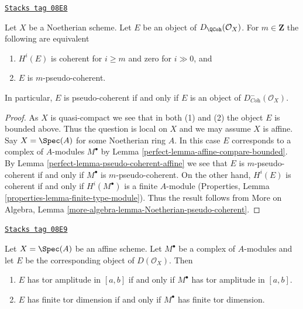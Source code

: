 \begin{lemma}
\label{perfect-lemma-identify-pseudo-coherent-noetherian}
\href{https://stacks.math.columbia.edu/tag/08E8}{\texttt{Stacks tag 08E8}}

Let $X$ be a Noetherian scheme. Let $E$ be an object of
$D_\QCoh(\mathcal{O}_X)$. For $m \in \mathbf{Z}$ the
following are equivalent
\begin{enumerate}
\item $H^i(E)$ is coherent for $i \geq m$ and zero for $i \gg 0$, and
\item $E$ is $m$-pseudo-coherent.
\end{enumerate}
In particular, $E$ is pseudo-coherent if and only if $E$ is an object
of $D^-_{\textit{Coh}}(\mathcal{O}_X)$.
\end{lemma}

\begin{proof}

As $X$ is quasi-compact we see that in both (1) and (2) the object $E$
is bounded above. Thus the question is local on $X$ and we may assume
$X$ is affine. Say $X = \Spec(A)$ for some Noetherian ring $A$.
In this case $E$ corresponds to a complex of $A$-modules $M^\bullet$
by Lemma \ref{perfect-lemma-affine-compare-bounded}. By
Lemma \ref{perfect-lemma-pseudo-coherent-affine}
we see that $E$ is $m$-pseudo-coherent if and only if $M^\bullet$
is $m$-pseudo-coherent. On the other hand, $H^i(E)$ is coherent
if and only if $H^i(M^\bullet)$ is a finite $A$-module
(Properties, Lemma \ref{properties-lemma-finite-type-module}).
Thus the result follows from More on Algebra, Lemma
\ref{more-algebra-lemma-Noetherian-pseudo-coherent}.
\end{proof}

\begin{lemma}
\label{perfect-lemma-tor-dimension-affine}
\href{https://stacks.math.columbia.edu/tag/08E9}{\texttt{Stacks tag 08E9}}

Let $X = \Spec(A)$ be an affine scheme. Let $M^\bullet$ be a
complex of $A$-modules and let $E$ be the corresponding object
of $D(\mathcal{O}_X)$. Then
\begin{enumerate}
\item $E$ has tor amplitude in $[a, b]$ if and only if $M^\bullet$
has tor amplitude in $[a, b]$.
\item $E$ has finite tor dimension if and only if $M^\bullet$
has finite tor dimension.
\end{enumerate}
\end{lemma}

